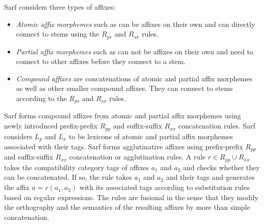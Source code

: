 Sarf considers three types of affixes: 
\begin{itemize}
  \item {\em Atomic affix morphemes } such as  can be affixes on their own and can directly connect to stems using the $R_{ps}$ and $R_{sx}$ rules. 
  \item {\em Partial affix morphemes} such as  can not be affixes on their own and need to connect to other affixes before they connect to a stem.
  \item {\em Compound affixes} are concatenations of atomic and partial affix morphemes as well as other smaller compound affixes. 
    They can connect to stems according to the $R_{ps}$ and $R_{sx}$ rules. 
\end{itemize}

Sarf forms compound affixes from atomic and partial affix morphemes using newly introduced prefix-prefix $R_{pp}$ and suffix-suffix $R_{xx}$ concatenation rules. 
%
Sarf considers $L_p$ and $L_x$ to be lexicons of atomic and partial affix morphemes associated with their tags. 
Sarf forms agglutinative affixes using prefix-prefix $R_{pp}$ and suffix-suffix $R_{xx}$ concatenation or agglutination rules.
A rule $r \in R_{pp} \cup R_{xx}$ takes the compatibility category tags of affixes $a_1$ and $a_2$ and checks whether they can be concatenated. 
If so, the rule takes $a_1$ and $a_2$ and their tags and generates the
affix $a=r(a_1,a_2)$ with its associated tags according to substitution rules based on regular expressions. 
The rules are fusional in the sense that they modify the orthography and the semantics of the resulting 
affixes by more than simple concatenation.


